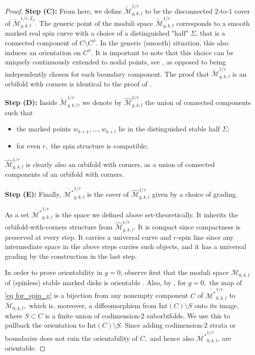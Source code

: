 \documentclass[11pt,a4paper]{article}
\theoremstyle{definition}
\theoremstyle{remark}
\numberwithin{equation}{section}
\def\Mbar{{\overline{\mathcal M}}}
\def\Mbarstar{{\overline{\mathcal M^*}}}
\begin{document}
\begin{proof}
\textbf{Step (C): }
From here, we define $\widetilde{\mathcal{M}}_{g,k,l}^{1/r}$ to be the disconnected $2$-to-$1$ cover of $\widetilde{\mathcal{M}}_{g,k,l}^{1/r,{\mathbb Z}_2}$. The generic point of the moduli space $\widetilde{\mathcal{M}}_{g,k,l}^{1/r}$ corresponds to a smooth marked real spin curve with a choice of a distinguished "half" $\Sigma$, that is a connected component of $C\setminus C^\phi$.  In the generic (smooth) situation, this also induces an orientation on $C^{\phi}$. It is important to note that this choice can be uniquely continuously extended to nodal points, see \cite[Section 2.6]{Zernik}, as opposed to being independently chosen for each boundary component.
The proof that $\widetilde{\mathcal{M}}_{g,k,l}^{1/r}$ is an orbifold with corners is identical to the proof of \cite[Thoerem 2]{Zernik}.

\textbf{Step (D): }
Inside $\widetilde{\mathcal{M}}_{g,k,l}^{1/r}$, we denote by $\widehat{\mathcal{M}}_{g,k,l}^{1/r}$ the union of connected components such that
\begin{itemize}
    \item the marked points $w_{k+1},\ldots, w_{k+l}$ lie in the distinguished stable half $\Sigma$;
    \item for even $r,$ the spin structure is compatible;
\end{itemize} 
$\widehat{\mathcal{M}}_{g,k,l}^{1/r}$ is clearly also an orbifold with corners, as a union of connected components of an orbifold with corners.

\textbf{Step (E): }
Finally, $\Mbarstar_{g,k,l}^{1/r}$ is the cover of $\widehat{\mathcal{M}}_{g,k,l}^{1/r}$ given by a choice of grading. 


As a set $\Mbarstar_{g,k,l}^{1/r}$ is the space we defined above set-theoretically. It inherits the orbifold-with-corners structure from $\widehat{\mathcal{M}}_{g,k,l}^{1/r}$. It is compact since compactness is preserved at every step. It carries a universal curve and $r$-spin line since any intermediate space in the above steps carries such objects, and it has a universal grading by the construction in the last step.

 
In order to prove orientability in $g=0$, observe first that the moduli space $\Mbar_{0,k,l}$ of (spinless) stable marked disks is orientable \cite[Proposition 3.12]{BCT1}.
Also, by \cite[Proposition 2.15, Observation 3.9]{BCT1}, for $g=0,$ the map of \eqref{eq for_spin_g} is a bijection from any nonempty component $C$ of $\Mbarstar_{0,k,l}^{1/r}$ to $\Mbar_{0,k,l},$ which is, moreover, a diffeomorphism from $\text{Int}(C)\setminus S$ onto its image, where $S\subset C$ is a finite union of codimension-$2$ suborbifolds. We use this to pullback the orientation to $\text{Int}(C)\setminus S$. Since adding codimension-$2$ strata or boundaries does not ruin the orientability of $C,$ and hence also $\Mbarstar_{0,k,l}^{1/r}$, are orientable.
\end{proof}
\end{document}
